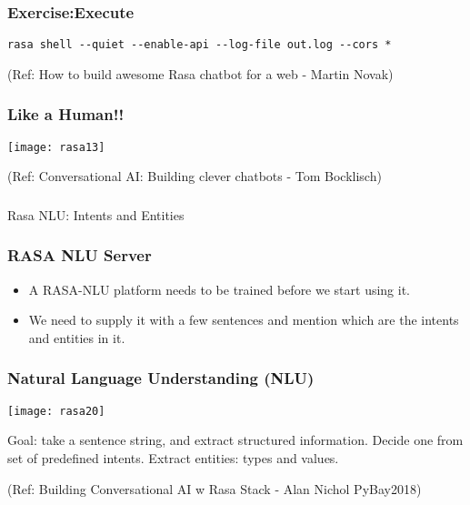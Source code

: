  \begin{frame}[fragile]\frametitle{Exercise:Execute}

\begin{lstlisting}
rasa shell --quiet --enable-api --log-file out.log --cors *
\end{lstlisting}


{\tiny (Ref: How to build awesome Rasa chatbot for a web - Martin Novak)}

\end{frame}

\begin{frame}[fragile]\frametitle{Like a Human!!}


\begin{center}
\texttt{[image: rasa13]}
\end{center}


{\tiny (Ref: Conversational AI: Building clever chatbots - Tom Bocklisch)}

\end{frame}

\begin{frame}[fragile]\frametitle{}
\begin{center}

{\Large Rasa NLU: Intents and Entities}

\end{center}
\end{frame}

 \begin{frame}[fragile]\frametitle{RASA NLU Server}
\begin{itemize}
\item A RASA-NLU platform needs to be trained before we start using it. 
\item We need to supply it with a few sentences and mention which are the intents and entities in it.
\end{itemize}
\end{frame}

\begin{frame}[fragile]\frametitle{Natural Language Understanding (NLU)}


\begin{center}
\texttt{[image: rasa20]}
\end{center}

Goal: take a sentence string, and extract structured information. Decide one from set of predefined intents. Extract entities: types and values.

{\tiny (Ref: Building Conversational AI w Rasa Stack - Alan Nichol  PyBay2018)}

\end{frame}

